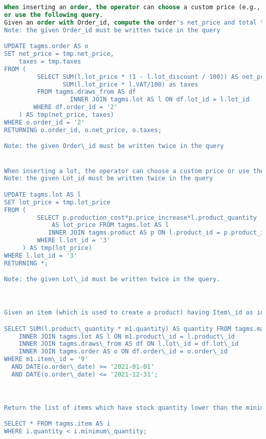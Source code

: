 \begin{lstlisting}[language=SQL,
keywordstyle=\color{blue},
stringstyle=\color{mauve},
showstringspaces=false,
basicstyle=\ttfamily\footnotesize]
When inserting an order, the operator can choose a custom price (e.g., decided with the customer)
or use the following query.
Given an order with Order_id, compute the order's net_price and total taxes.
Note: the given Order_id must be written twice in the query

UPDATE tagms.order AS o
SET net_price = tmp.net_price,
    taxes = tmp.taxes
FROM (
         SELECT SUM(l.lot_price * (1 - l.lot_discount / 100)) AS net_price,
                SUM(l.lot_price * l.VAT/100) as taxes
         FROM tagms.draws_from AS df
                  INNER JOIN tagms.lot AS l ON df.lot_id = l.lot_id
        WHERE df.order_id = '2'
    ) AS tmp(net_price, taxes)
WHERE o.order_id = '2'
RETURNING o.order_id, o.net_price, o.taxes;

Note: the given Order\_id must be written twice in the query


When inserting a lot, the operator can choose a custom price or use the following query.Given a lot with Lot_id, compute the lot price
Note: the given Lot_id must be written twice in the query

UPDATE tagms.lot AS l
SET lot_price = tmp.lot_price
FROM (
         SELECT p.production_cost*p.price_increase*l.product_quantity
             AS lot_price FROM tagms.lot AS l
            INNER JOIN tagms.product AS p ON l.product_id = p.product_id
         WHERE l.lot_id = '3'
     ) AS tmp(lot_price)
WHERE l.lot_id = '3'
RETURNING *;

Note: the given Lot\_id must be written twice in the query.



Given an item (which is used to create a product) having Item\_id as identifier and a time interval (actually, two dates), find the total quantity of that item that has been used for production or packaging during that time.

SELECT SUM(l.product\_quantity * m1.quantity) AS quantity FROM tagms.made\_up\_of\_1 AS m1
    INNER JOIN tagms.lot AS l ON m1.product\_id = l.product\_id
    INNER JOIN tagms.draws\_from AS df ON l.lot\_id = df.lot\_id
    INNER JOIN tagms.order AS o ON df.order\_id = o.order\_id
WHERE m1.item\_id = '9'
  AND DATE(o.order\_date) >= '2021-01-01'
  AND DATE(o.order\_date) <= '2021-12-31';



Return the list of items which have stock quantity lower than the minimum one.

SELECT * FROM tagms.item AS i
WHERE i.quantity < i.minimum\_quantity;




\end{lstlisting}
